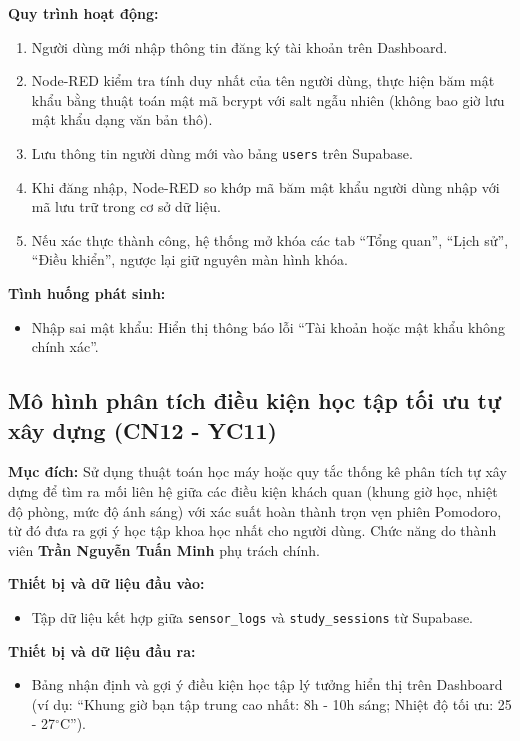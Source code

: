 \textbf{Quy trình hoạt động:}
\begin{enumerate}
    \item Người dùng mới nhập thông tin đăng ký tài khoản trên Dashboard.
    \item Node-RED kiểm tra tính duy nhất của tên người dùng, thực hiện băm mật khẩu bằng thuật toán mật mã bcrypt với salt ngẫu nhiên (không bao giờ lưu mật khẩu dạng văn bản thô).
    \item Lưu thông tin người dùng mới vào bảng \texttt{users} trên Supabase.
    \item Khi đăng nhập, Node-RED so khớp mã băm mật khẩu người dùng nhập với mã lưu trữ trong cơ sở dữ liệu.
    \item Nếu xác thực thành công, hệ thống mở khóa các tab ``Tổng quan'', ``Lịch sử'', ``Điều khiển'', ngược lại giữ nguyên màn hình khóa.
\end{enumerate}

\textbf{Tình huống phát sinh:}
\begin{itemize}
    \item Nhập sai mật khẩu: Hiển thị thông báo lỗi ``Tài khoản hoặc mật khẩu không chính xác''.
\end{itemize}

\subsection{Mô hình phân tích điều kiện học tập tối ưu tự xây dựng (CN12 - YC11)}
\textbf{Mục đích:}
Sử dụng thuật toán học máy hoặc quy tắc thống kê phân tích tự xây dựng để tìm ra mối liên hệ giữa các điều kiện khách quan (khung giờ học, nhiệt độ phòng, mức độ ánh sáng) với xác suất hoàn thành trọn vẹn phiên Pomodoro, từ đó đưa ra gợi ý học tập khoa học nhất cho người dùng. Chức năng do thành viên \textbf{Trần Nguyễn Tuấn Minh} phụ trách chính.

\textbf{Thiết bị và dữ liệu đầu vào:}
\begin{itemize}
    \item Tập dữ liệu kết hợp giữa \texttt{sensor\_logs} và \texttt{study\_sessions} từ Supabase.
\end{itemize}

\textbf{Thiết bị và dữ liệu đầu ra:}
\begin{itemize}
    \item Bảng nhận định và gợi ý điều kiện học tập lý tưởng hiển thị trên Dashboard (ví dụ: ``Khung giờ bạn tập trung cao nhất: 8h - 10h sáng; Nhiệt độ tối ưu: 25 - 27$^\circ$C'').
\end{itemize}

